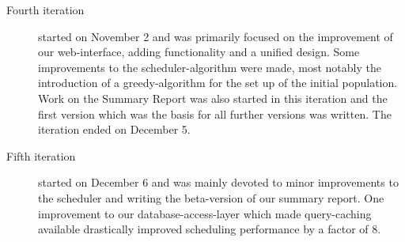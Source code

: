 \begin{description}
\item[Fourth iteration] started on November 2 and was primarily focused on the improvement of our web-interface, adding functionality and a unified design. Some improvements to the scheduler-algorithm were made, most notably the introduction of a greedy-algorithm for the set up of the initial population. Work on the Summary Report was also started in this iteration and the first version which was the basis for all further versions was written. The iteration ended on December 5.

\item[Fifth iteration] started on December 6 and was mainly devoted to minor improvements to the scheduler and writing the beta-version of our summary report. One improvement to our database-access-layer which made query-caching available drastically improved scheduling performance by a factor of 8.
\end{description}